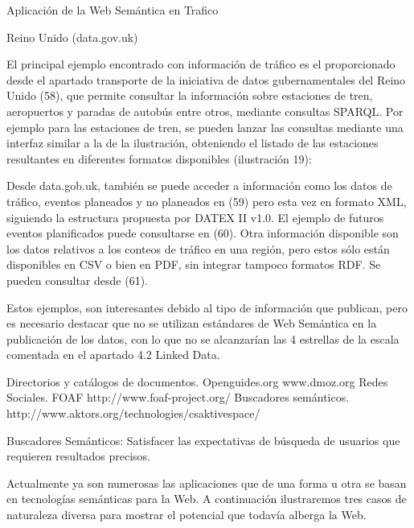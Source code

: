 Aplicación de la Web Semántica en Trafico


Reino Unido (data.gov.uk)

El principal ejemplo encontrado con información de tráfico es el proporcionado desde el apartado transporte de la iniciativa de datos gubernamentales del Reino Unido (58), que permite consultar la información sobre estaciones de tren, aeropuertos y paradas de autobús entre otros, mediante consultas SPARQL.
Por ejemplo para las estaciones de tren, se pueden lanzar las consultas mediante una interfaz similar a la de la ilustración, obteniendo el listado de las estaciones resultantes en diferentes formatos disponibles (ilustración 19):

Desde data.gob.uk, también se puede acceder a información como los datos de tráfico, eventos planeados y no planeados en (59) pero esta vez en formato XML, siguiendo la estructura propuesta por DATEX II v1.0. El ejemplo de futuros eventos planificados puede consultarse en (60).
Otra información disponible son los datos relativos a los conteos de tráfico en una región, pero estos sólo están disponibles en CSV o bien en PDF, sin integrar tampoco formatos RDF. Se pueden consultar desde (61).

Estos ejemplos, son interesantes debido al tipo de información que publican, pero es necesario destacar que no se utilizan estándares de Web Semántica en la publicación de los datos, con lo que no se alcanzarían las 4 estrellas de la escala comentada en el apartado 4.2 Linked Data.

Directorios y catálogos de documentos.
Openguides.org
www.dmoz.org
Redes Sociales. FOAF
http://www.foaf-project.org/
Buscadores semánticos.
http://www.aktors.org/technologies/csaktivespace/

Buscadores Semánticos: Satisfacer las expectativas de búsqueda de usuarios que requieren resultados precisos.

Actualmente ya son numerosas las aplicaciones que de una forma u otra se basan en tecnologías semánticas para la Web. A continuación ilustraremos tres casos de naturaleza diversa para mostrar el potencial que todavía alberga la Web.

